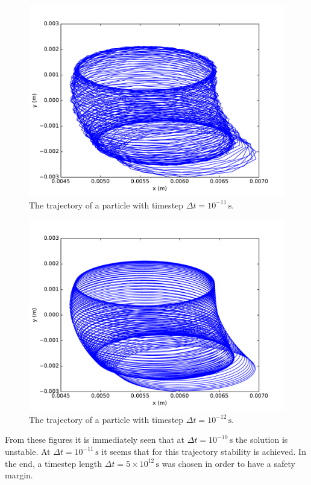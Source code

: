 \documentclass[11pt, a4paper]{article}
\begin{document}
\begin{figure}
    \centering
    \includegraphics[width=\textwidth]{output/particle_trajectory_11.pdf}
    \caption{The trajectory of a particle with timestep $\Delta t = 10^{-11}\,\si{\second}$.}
    \label{fig:particle11}
\end{figure}
\begin{figure}
    \centering
    \includegraphics[width=\textwidth]{output/particle_trajectory_12.pdf}
    \caption{The trajectory of a particle with timestep $\Delta t = 10^{-12}\,\si{\second}$.}
    \label{fig:particle12}
\end{figure}
From these figures it is immediately seen that at $\Delta t = 10^{-10}\,\si{\second}$ the solution is unstable. At $\Delta t = 10^{-11}\,\si{\second}$ it seems that for this trajectory stability is achieved. In the end, a timestep length $\Delta t = 5\times 10^{12}\,\si{\second}$ was chosen in order to have a safety margin.
\end{document}
